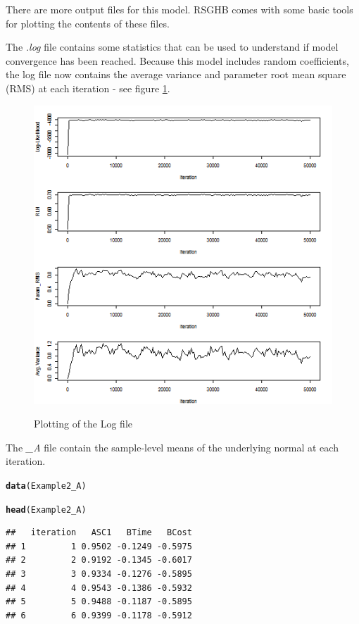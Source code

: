 \documentclass{article}\usepackage[]{graphicx}\usepackage[]{color}
\makeatletter
\newcommand{\hlstd}[1]{\textcolor[rgb]{0.345,0.345,0.345}{#1}}%
\newcommand{\hlkwd}[1]{\textcolor[rgb]{0.737,0.353,0.396}{\textbf{#1}}}%
\newenvironment{kframe}{%
 \def\at@end@of@kframe{}%
 \ifinner\ifhmode%
  \def\at@end@of@kframe{\end{minipage}}%
  \begin{minipage}{\columnwidth}%
 \fi\fi%
 \def\FrameCommand##1{\hskip\@totalleftmargin \hskip-\fboxsep
 \colorbox{shadecolor}{##1}\hskip-\fboxsep
     \hskip-\linewidth \hskip-\@totalleftmargin \hskip\columnwidth}%
 \MakeFramed {\advance\hsize-\width
   \@totalleftmargin\z@ \linewidth\hsize
   \@setminipage}}%
 {\par\unskip\endMakeFramed%
 \at@end@of@kframe}
\newenvironment{knitrout}{}{} %
\makeatother
\begin{document}
There are more output files for this model. RSGHB comes with some basic tools for plotting the contents of these files.

The \emph{.log} file contains some statistics that can be used to understand if model convergence has been reached. Because this model includes random coefficients, the log file now contains the average variance and parameter root mean square (RMS) at each iteration - see figure \ref{logfile2}. 

\begin{figure}
\caption{Plotting of the Log file}
\includegraphics[scale=0.50]{MNL_logPlot2.png}
\label{logfile2}
\end{figure}

The \emph{\_A} file contain the sample-level means of the underlying normal at each iteration.

\begin{knitrout}
\color{fgcolor}\begin{kframe}
\begin{alltt}
\hlkwd{data}\hlstd{(Example2_A)}

\hlkwd{head}\hlstd{(Example2_A)}
\end{alltt}
\begin{verbatim}
##   iteration   ASC1   BTime   BCost
## 1         1 0.9502 -0.1249 -0.5975
## 2         2 0.9192 -0.1345 -0.6017
## 3         3 0.9334 -0.1276 -0.5895
## 4         4 0.9543 -0.1386 -0.5932
## 5         5 0.9488 -0.1187 -0.5895
## 6         6 0.9399 -0.1178 -0.5912
\end{verbatim}
\end{kframe}
\end{knitrout}
\end{document}
